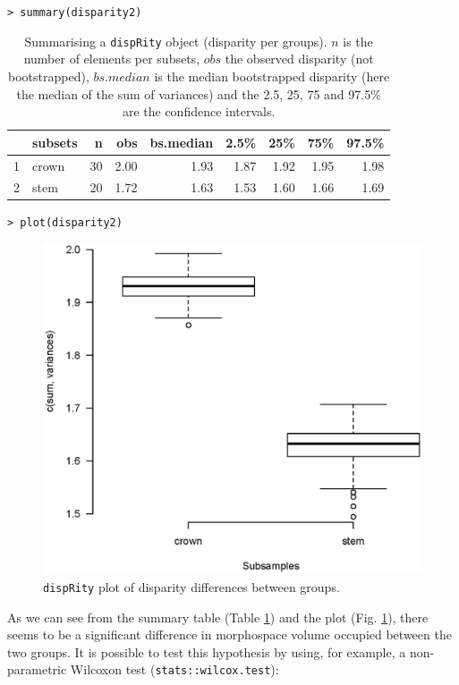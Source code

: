 \documentclass[12pt,letterpaper]{article}
\newcommand{\disp}{\texttt{dispRity} }
\begin{document}
\noindent \texttt{> summary(disparity2)}

\begin{table}[ht]
\centering
\begin{tabular}{rlrrrrrrr}
  \hline
 & subsets & n & obs & bs.median & 2.5\% & 25\% & 75\% & 97.5\% \\ 
  \hline
1 & crown &  30 & 2.00 & 1.93 & 1.87 & 1.92 & 1.95 & 1.98 \\ 
  2 & stem &  20 & 1.72 & 1.63 & 1.53 & 1.60 & 1.66 & 1.69 \\ 
   \hline
\end{tabular}
\caption{Summarising a \disp object (disparity per groups). $n$ is the number of elements per subsets, $obs$ the observed disparity (not bootstrapped), $bs.median$ is the median bootstrapped disparity (here the median of the sum of variances) and the 2.5, 25, 75 and 97.5\% are the confidence intervals.}
\label{Tab:summary_group}
\end{table}

\noindent \texttt{> plot(disparity2)}

\begin{figure}[!htbp]
\centering
   \includegraphics[width=1\textwidth]{plot_example_group.eps} 
\caption{\disp plot of disparity differences between groups.}
\label{Fig:plot_group}
\end{figure}

As we can see from the summary table (Table \ref{Tab:summary_group}) and the plot (Fig. \ref{Fig:plot_group}), there seems to be a significant difference in morphospace volume occupied between the two groups.
It is possible to test this hypothesis by using, for example, a non-parametric Wilcoxon test (\texttt{stats::wilcox.test}):
\end{document}
